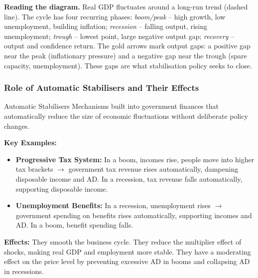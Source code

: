 \documentclass[11pt, a4paper, twoside]{book}
\begin{document}
\begin{diagrambox}
{%
}%
\par\vspace{6pt}
{\small\color{AxisCharcoal}\RaggedRight
\textbf{\color{CurveNavy}Reading the diagram.}  Real GDP fluctuates around a long-run trend (dashed line).  The cycle has four recurring phases: \textit{boom/peak} -- high growth, low unemployment, building inflation; \textit{recession} -- falling output, rising unemployment; \textit{trough} -- lowest point, large negative output gap; \textit{recovery} -- output and confidence return.  The gold arrows mark output gaps: a positive gap near the peak (inflationary pressure) and a negative gap near the trough (spare capacity, unemployment).  These gaps are what stabilisation policy seeks to close.\par}
\end{diagrambox}

\subsubsection{Role of Automatic Stabilisers and Their Effects}

\begin{keyterm}{Automatic Stabilisers}
Mechanisms built into government finances that automatically reduce the size of economic fluctuations without deliberate policy changes.

\textbf{Key Examples:}
\begin{itemize}
  \item \textbf{Progressive Tax System:} In a boom, incomes rise, people move into higher tax brackets $\rightarrow$ government tax revenue rises automatically, dampening disposable income and AD. In a recession, tax revenue falls automatically, supporting disposable income.
  \item \textbf{Unemployment Benefits:} In a recession, unemployment rises $\rightarrow$ government spending on benefits rises automatically, supporting incomes and AD. In a boom, benefit spending falls.
\end{itemize}

\textbf{Effects:} They smooth the business cycle. They reduce the multiplier effect of shocks, making real GDP and employment more stable. They have a moderating effect on the price level by preventing excessive AD in booms and collapsing AD in recessions.
\end{keyterm}
\end{document}
